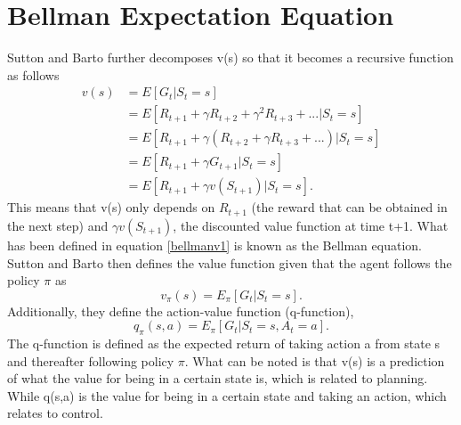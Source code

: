 \section{Bellman Expectation Equation}
Sutton and Barto \cite{sutton_barto} further decomposes v(s) so that it becomes a recursive function as follows
\begin{align}
	v(s) &= E[G_t | S_t = s]\\
	&= E[R_{t+1} + \gamma R_{t+2} + \gamma^{2} R_{t+3} + ...|S_t = s]\\
	&= E[R_{t+1} + \gamma (R_{t+2} + \gamma R_{t+3} + ...)|S_t = s]\\
	&= E[R_{t+1} + \gamma G_{t+1}|S_t = s]\\
	&= E[R_{t+1} + \gamma v(S_{t+1})|S_t = s].
	\label{bellmanv1}
\end{align}
This means that v(s) only depends on $R_{t+1}$ (the reward that can be obtained in the next step) and $\gamma v(S_{t+1})$, the discounted value function at time t+1.
What has been defined in equation \ref{bellmanv1} is known as the Bellman equation.\cite{sutton_barto}
Sutton and Barto then defines the value function given that the agent follows the policy $\pi$ as
\begin{equation}
	v_{\pi}(s) = E_{\pi}[G_t | S_t = s].
\end{equation}
Additionally, they define the action-value function (q-function),
\begin{equation}
	q_{\pi}(s,a) = E_{\pi}[G_t | S_t = s,A_t = a].
\end{equation}
The q-function is defined as the expected return of taking action a from state s and thereafter following policy $\pi$. What can be noted is that v(s) is a prediction of what the value for being in a certain state is, which is related to planning. While q(s,a) is the value for being in a certain state and taking an action, which relates to control. 

